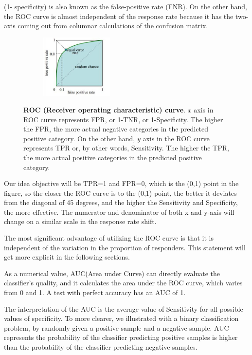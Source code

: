 (1- specificity) is also known as the false-positive rate (FNR). On the other hand, the ROC curve is almost independent of the response rate because it has the two-axis coming out from columnar calculations of the confusion matrix.

\begin{figure}[h]
	\begin{center}
		\begin{subfigure}[b]{\textwidth}
		    \centering
			\includegraphics[width=0.4\textwidth]{thesis-template-master/images/ROC.JPG}
			\label{fig:cellnet}
		\end{subfigure}
	\end{center}
	\caption{\textbf{ROC (Receiver operating characteristic) curve}. $x$ axis in ROC curve represents FPR, or 1-TNR, or 1-Specificity. The higher the FPR, the more actual negative categories in the predicted positive category. On the other hand, $y$ axis in the ROC curve represents TPR or, by other words, Sensitivity. The higher the TPR, the more actual positive categories in the predicted positive category.}
\end{figure}
Our idea objective will be TPR=1 and FPR=0, which is the (0,1) point in the figure, so the closer the ROC curve is to the (0,1) point, the better it deviates from the diagonal of 45 degrees, and the higher the Sensitivity and Specificity, the more effective.
The numerator and denominator of both x and y-axis will change on a similar scale in the response rate shift.

The most significant advantage of utilizing the ROC curve is that it is independent of the variation in the proportion of responders. This statement will get more explicit in the following sections.

As a numerical value, AUC(Area under Curve) can directly evaluate the classifier's quality, and it calculates the area under the ROC curve, which varies from 0 and 1.  A test with perfect accuracy has an AUC of 1.

The interpretation of the AUC is the average value of Sensitivity for all possible values of specificity. To more clearer, we illustrated with a binary classification problem, by randomly given a positive sample and a negative sample. AUC represents the probability of the classifier predicting positive samples is higher than the probability of the classifier predicting negative samples.%


